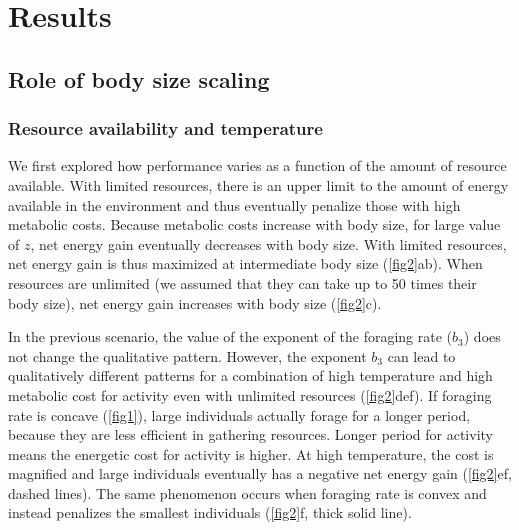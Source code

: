 \section*{Results}
\subsection*{Role of body size scaling}
\subsubsection*{Resource availability and temperature}
We first explored how performance varies as a function of the amount of resource available.
With limited resources,  there is an upper limit to the amount of energy available in the environment and thus eventually penalize those with high metabolic costs.
Because metabolic costs increase with  body size, for large value of $z$, net energy gain eventually decreases with body size. 
With limited resources, net energy gain is thus maximized at intermediate body size (\cref{fig2}ab). 
 When resources are unlimited (we assumed that they can take up to 50 times their body size), net energy gain increases with body size (\cref{fig2}c).

In the previous scenario, the value of the exponent of the foraging rate ($b_3$) does not change the qualitative pattern.
However,  the exponent $b_3$ can lead to qualitatively different patterns  for a combination of high temperature and high metabolic cost for activity even with unlimited resources (\cref{fig2}def).
If foraging rate is concave (\cref{fig1}), large individuals actually forage for a longer period, because they are less efficient in gathering resources.
Longer period for  activity means the energetic cost for activity is higher.
At high temperature, the cost is magnified and  large individuals eventually has a negative net energy gain (\cref{fig2}ef, dashed lines).
The same phenomenon occurs when foraging rate is convex and instead penalizes the smallest individuals (\cref{fig2}f, thick solid line).
